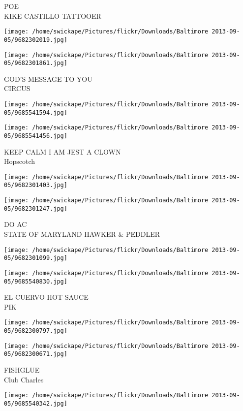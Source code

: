 \documentclass[10pt,letterpaper]{article}
\begin{document}
POE\\
KIKE CASTILLO TATTOOER
\pagebreak

\texttt{[image: /home/swickape/Pictures/flickr/Downloads/Baltimore 2013-09-05/9682302019.jpg]}

\vspace{0.25in}
\texttt{[image: /home/swickape/Pictures/flickr/Downloads/Baltimore 2013-09-05/9682301861.jpg]}

GOD'S MESSAGE TO YOU\\
CIRCUS
\pagebreak

\texttt{[image: /home/swickape/Pictures/flickr/Downloads/Baltimore 2013-09-05/9685541594.jpg]}

\vspace{0.25in}
\texttt{[image: /home/swickape/Pictures/flickr/Downloads/Baltimore 2013-09-05/9685541456.jpg]}

KEEP CALM I AM JEST A CLOWN\\
Hopscotch
\pagebreak

\texttt{[image: /home/swickape/Pictures/flickr/Downloads/Baltimore 2013-09-05/9682301403.jpg]}

\vspace{0.25in}
\texttt{[image: /home/swickape/Pictures/flickr/Downloads/Baltimore 2013-09-05/9682301247.jpg]}

DO AC\\
STATE OF MARYLAND HAWKER \& PEDDLER
\pagebreak

\texttt{[image: /home/swickape/Pictures/flickr/Downloads/Baltimore 2013-09-05/9682301099.jpg]}

\vspace{0.25in}
\texttt{[image: /home/swickape/Pictures/flickr/Downloads/Baltimore 2013-09-05/9685540830.jpg]}

EL CUERVO HOT SAUCE\\
PIK
\pagebreak

\texttt{[image: /home/swickape/Pictures/flickr/Downloads/Baltimore 2013-09-05/9682300797.jpg]}

\vspace{0.25in}
\texttt{[image: /home/swickape/Pictures/flickr/Downloads/Baltimore 2013-09-05/9682300671.jpg]}

FISHGLUE\\
Club Charles
\pagebreak

\texttt{[image: /home/swickape/Pictures/flickr/Downloads/Baltimore 2013-09-05/9685540342.jpg]}
\end{document}
